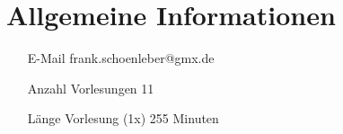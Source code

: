 
\chapter{Allgemeine Informationen}

\begin{itemize}
	\item [E-Mail] frank.schoenleber@gmx.de
	\item[Anzahl Vorlesungen] 11
	\item[Länge Vorlesung (1x)] 255 Minuten
\end{itemize}